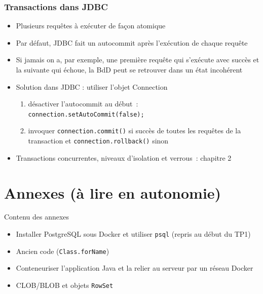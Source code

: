 \documentclass[aspectratio=169,10pt]{beamer}
\begin{document}
\begin{frame}
	\frametitle{Transactions dans JDBC}
	\begin{itemize}		
		\item Plusieurs requêtes à exécuter de façon atomique
		\item Par défaut, JDBC fait un autocommit après  l'exécution de chaque requête
		\item Si jamais on a, par exemple, une première requête qui s'exécute avec succès et la suivante qui échoue, la BdD peut se retrouver dans un état incohérent
		\item Solution dans JDBC : utiliser l'objet Connection
		\begin{enumerate}
			\item désactiver l'autocommit au début~:\\
			\texttt{connection.setAutoCommit(false);}
			\item invoquer \texttt{connection.commit()} si succès de toutes les requêtes de la transaction et \texttt{connection.rollback()} sinon
		\end{enumerate}
		\item Transactions concurrentes, niveaux d'isolation et verrous~: \alert{chapitre 2}
		
	\end{itemize}
\end{frame}


\rquestionslide


\appendix
\section{Annexes (\`a lire en autonomie)}

\begin{frame}{Contenu des annexes}
  \begin{itemize}
    \item Installer PostgreSQL sous Docker et utiliser \texttt{psql} (repris au d\'ebut du TP1)
    \item Ancien code (\texttt{Class.forName})
    \item Conteneuriser l'application Java et la relier au serveur par un r\'eseau Docker
    \item CLOB/BLOB et objets \texttt{RowSet}
  \end{itemize}
\end{frame}
\end{document}
